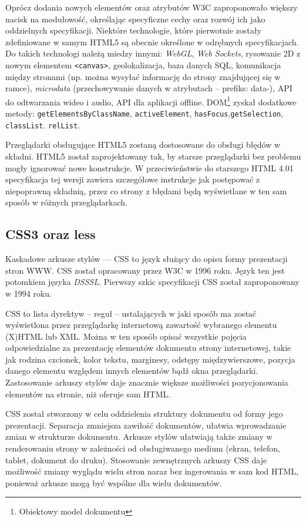 Oprócz dodania nowych elementów oraz atrybutów W3C zaproponowało większy nacisk na modułowość, określając specyficzne cechy oraz rozwój ich jako oddzielnych specyfikacji. Niektóre technologie, które pierwotnie zostały zdefiniowane w samym HTML5 są obecnie określone w odrębnych specyfikacjach. Do takich technologi należą miedzy innymi: \emph{WebGL}, \emph{Web Sockets}, rysowanie 2D z nowym elementem \verb|<canvas>|, geolokalizacja, baza danych SQL, komunikacja między stronami (np. można wysyłać informację do strony znajdującej się w ramce), \emph{microdata} (przechowywanie danych w atrybutach -- prefiks: data-), API do odtwarzania wideo i audio, API dla aplikacji offline. DOM\footnote{Obiektowy model dokumentu} zyskał dodatkowe metody: \verb|getElementsByClassName|, \verb|activeElement|, \verb|hasFocus|,\verb|getSelection|, \verb|classList|. \verb|relList|\cite{htmlWiki}.

Przeglądarki obsługujące HTML5 zostaną dostosowane do obsługi błędów w składni. HTML5 został zaprojektowany tak, by starsze przeglądarki bez problemu mogły ignorować nowe konstrukcje. W przeciwieństwie do starszego HTML 4.01 specyfikacja tej wersji zawiera szczegółowe instrukcje jak postępować z niepoprawną składnią, przez co strony z błędami będą wyświetlane w ten sam sposób w różnych przeglądarkach.

\subsection{CSS3 oraz less}
Kaskadowe arkusze stylów --- CSS to język służący do opisu formy prezentacji stron WWW. CSS został opracowany przez W3C w 1996 roku. Język ten jest potomkiem języka \emph{DSSSL}. Pierwszy szkic specyfikacji CSS został zaproponowany w 1994 roku. 

CSS to lista dyrektyw -- reguł -- ustalających w jaki sposób ma zostać wyświetlona przez przeglądarkę internetową zawartość wybranego elementu (X)HTML lub XML. Można w ten sposób opisać wszystkie pojęcia odpowiedzialne za prezentację elementów dokumentu strony internetowej, takie jak rodzina czcionek, kolor tekstu, marginesy, odstępy międzywierszowe, pozycja danego elementu względem innych elementów bądź okna przeglądarki. Zastosowanie arkuszy stylów daje znacznie większe możliwości pozycjonowania elementów na stronie, niż oferuje sam HTML\cite{cssWiki}. 

CSS został stworzony w celu oddzielenia struktury dokumentu od formy jego prezentacji. Separacja zmniejsza zawiłość dokumentów, ułatwia wprowadzanie zmian w strukturze dokumentu. Arkusze stylów ułatwiają także zmiany w renderowaniu strony w zależności od obsługiwanego medium (ekran, telefon, tablet, dokument do druku). Stosowanie zewnętrznych arkuszy CSS daje możliwość zmiany wyglądu wielu stron naraz bez ingerowania w sam kod HTML, ponieważ arkusze mogą być wspólne dla wielu dokumentów. 

